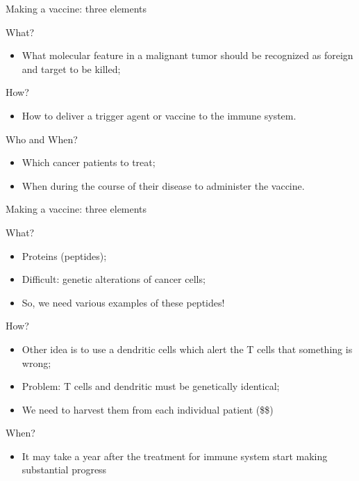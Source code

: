 \documentclass[dvips,11pt,xcolor=dvipsnames]{beamer}
\numberwithin{table}{section}
\numberwithin{figure}{section} %
\begin{document}
\begin{frame}{Making a vaccine: three elements}
 \begin{exampleblock}{What?}
    \begin{itemize}
    \item What molecular feature in a  malignant tumor should  be recognized as
      foreign and target to be killed;
    \end{itemize}
  \end{exampleblock}

\pause \begin{exampleblock}{How?}
    \begin{itemize}
    \item How to deliver a trigger agent or vaccine to the immune system.
    \end{itemize}
  \end{exampleblock}

\pause \begin{exampleblock}{Who and When?}
    \begin{itemize}
    \item Which cancer patients to treat; 
      \item When during the course of their
      disease to administer the vaccine.
    \end{itemize}
  \end{exampleblock}
\end{frame}

\begin{frame}{Making a vaccine: three elements}
 \begin{block}{What?}
    \begin{itemize}
    \item Proteins (peptides);
    \item Difficult: genetic alterations of cancer cells;
    \item So, we need various examples of these peptides!
    \end{itemize}
  \end{block}

  \pause \begin{block}{How?}
    \begin{itemize}
    \item Other idea  is to use a  dendritic cells which alert the  T cells that
      something is wrong;
    \item Problem: T cells and dendritic must be genetically identical;
    \item We need to harvest them from each individual patient (\$\$)
    \end{itemize}
  \end{block}

  \pause \begin{alertblock}{When?}
    \begin{itemize}
    \item It may take a year  after the treatment for immune system start making
      substantial progress
    \end{itemize}
  \end{alertblock}
\end{frame}
\end{document}
